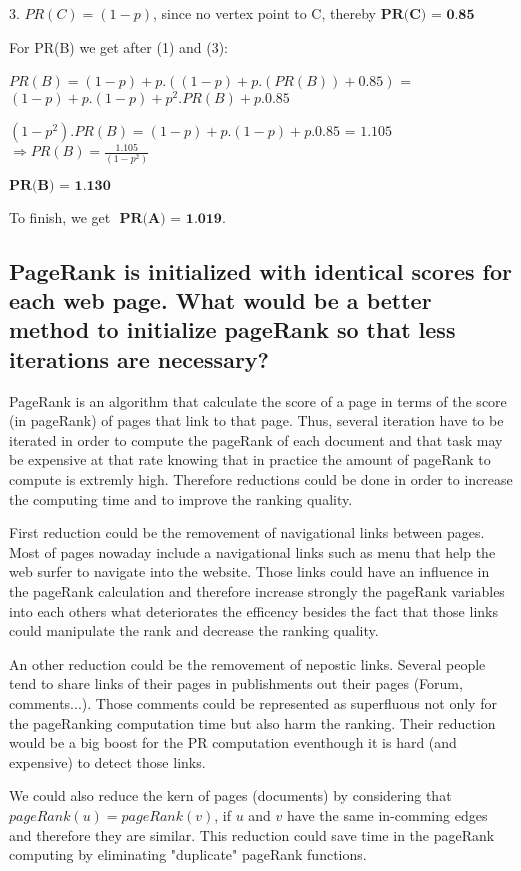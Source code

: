 \documentclass{scrartcl}
\begin{document}
3. $PR(C) = (1 - p)$, since no vertex point to C, thereby $\textbf{PR(C) = 0.85}$

For PR(B) we get after (1) and (3):

$PR(B) = (1 - p) + p.( (1 - p) + p.( PR(B))+ 0.85)$ = $(1-p) + p.(1-p) + p^2.PR(B) + p.0.85$

$(1- p^2). PR(B) = (1 - p) + p. (1-p) + p. 0.85$ = $ 1.105$ $ \Rightarrow PR(B) = \frac{1.105}{(1- p^2)}$

$\textbf{PR(B) = 1.130}$

To finish, we get $\textbf{ PR(A) = 1.019}$.

\subsection { PageRank is initialized with identical scores for each web page. What would be a better
method to initialize pageRank so that less iterations are necessary?}

PageRank is an algorithm that calculate the score of a page in terms of the score (in pageRank) of pages that link to that page. Thus, several iteration have to be iterated in order to compute the pageRank of each document and that task may be expensive at that rate knowing that in practice the amount of pageRank to compute is extremly high. Therefore reductions could be done in order to increase the computing time and to improve the ranking quality.

First reduction could be the removement of navigational links between pages. Most of pages nowaday include a navigational links such as menu that help the web surfer to navigate into the website. Those links could have an influence in the pageRank calculation and therefore increase strongly the pageRank variables into each others what deteriorates the efficency besides the fact that those links could manipulate the rank and decrease the ranking quality.

An other reduction could be the removement of nepostic links. Several people tend to share links of their pages in publishments  out their pages  (Forum, comments...). Those comments could be represented as superfluous not only for the pageRanking computation time but also harm the ranking. Their reduction would be a big boost for the PR computation eventhough it is hard (and expensive) to detect those links.

We could also reduce the kern of pages (documents) by considering that $pageRank(u)= pageRank(v)$, if $u$ and $v$ have the same in-comming edges and therefore they are similar. This reduction could save time in the pageRank computing by eliminating "duplicate" pageRank functions.
\end{document}
